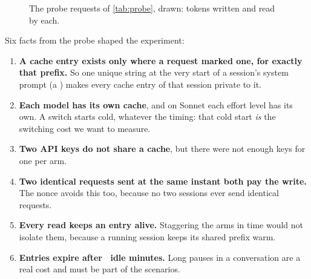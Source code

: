 \begin{figure}[htbp]
\centering
{}\par\smallskip

\caption{The probe requests of \cref{tab:probe}, drawn: tokens written and read by each.}
\label{fig:probe}
\end{figure}

\begin{keyidea}
Six facts from the probe shaped the experiment:
\begin{enumerate}[leftmargin=1.4em]
  \item \textbf{A cache entry exists only where a request marked one, for exactly that prefix.} So one unique
    string at the very start of a session's system prompt (a ) makes every cache entry of that
    session private to it.
  \item \textbf{Each model has its own cache}, and on Sonnet each effort level has its own. A switch starts
    cold, whatever the timing: that cold start \emph{is} the switching cost we want to measure.
  \item \textbf{Two API keys do not share a cache}, but there were not enough keys for one per arm.
  \item \textbf{Two identical requests sent at the same instant both pay the write.} The nonce avoids this
    too, because no two sessions ever send identical requests.
  \item \textbf{Every read keeps an entry alive.} Staggering the arms in time would not isolate them, because
    a running session keeps its shared prefix warm.
  \item \textbf{Entries expire after \CacheTTLMin\ idle minutes.} Long pauses in a conversation are a
    real cost and must be part of the scenarios.
\end{enumerate}
\end{keyidea}
